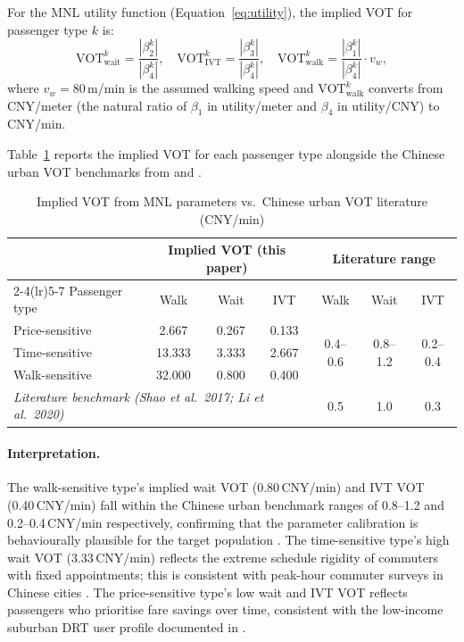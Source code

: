 For the MNL utility function (Equation~\ref{eq:utility}), the implied VOT for
passenger type $k$ is:
\begin{equation}\label{eq:vot-formula}
  \text{VOT}_{\text{wait}}^k = \frac{|\beta_2^k|}{|\beta_4^k|}, \quad
  \text{VOT}_{\text{IVT}}^k  = \frac{|\beta_3^k|}{|\beta_4^k|}, \quad
  \text{VOT}_{\text{walk}}^k = \frac{|\beta_1^k|}{|\beta_4^k|} \cdot v_w,
\end{equation}
where $v_w = 80$\,m/min is the assumed walking speed and
$\text{VOT}_{\text{walk}}^k$ converts from CNY/meter (the natural ratio
of $\beta_1$ in utility/meter and $\beta_4$ in utility/CNY) to CNY/min.

Table~\ref{tab:vot-mapping} reports the implied VOT for each passenger type
alongside the Chinese urban VOT benchmarks from \citet{shao2017} and
\citet{li2020drt}.

\begin{table}[h]
\centering
\caption{Implied VOT from MNL parameters vs.\ Chinese urban VOT literature (CNY/min)}
\label{tab:vot-mapping}
\begin{tabular}{lcccccc}
\toprule
 & \multicolumn{3}{c}{Implied VOT (this paper)} & \multicolumn{3}{c}{Literature range} \\
\cmidrule(lr){2-4}\cmidrule(lr){5-7}
Passenger type & Walk & Wait & IVT & Walk & Wait & IVT \\
\midrule
Price-sensitive  & 2.667 & 0.267 & 0.133 & \multirow{3}{*}{0.4--0.6} & \multirow{3}{*}{0.8--1.2} & \multirow{3}{*}{0.2--0.4} \\
Time-sensitive   & 13.333 & 3.333 & 2.667 & & & \\
Walk-sensitive   & 32.000 & 0.800 & 0.400 & & & \\
\midrule
\multicolumn{4}{l}{\textit{Literature benchmark (Shao et al.\ 2017; Li et al.\ 2020)}} & 0.5 & 1.0 & 0.3 \\
\bottomrule
\end{tabular}
\end{table}

\paragraph{Interpretation.}
The walk-sensitive type's implied wait VOT (0.80\,CNY/min) and IVT VOT
(0.40\,CNY/min) fall within the Chinese urban benchmark ranges of 0.8--1.2
and 0.2--0.4\,CNY/min respectively, confirming that the parameter calibration
is behaviourally plausible for the target population \citep{shao2017,li2020drt}.
The time-sensitive type's high wait VOT (3.33\,CNY/min) reflects the extreme
schedule rigidity of commuters with fixed appointments; this is consistent with
peak-hour commuter surveys in Chinese cities \citep{shao2017}.
The price-sensitive type's low wait and IVT VOT reflects passengers who
prioritise fare savings over time, consistent with the low-income suburban
DRT user profile documented in \citet{li2020drt}.

